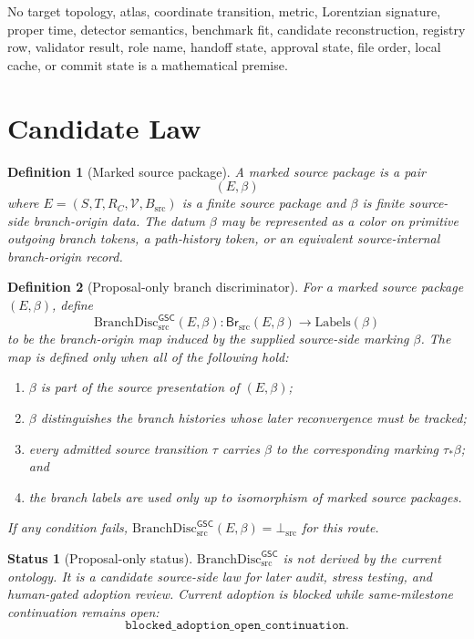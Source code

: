 \documentclass[11pt]{article}
\newcommand{\BottomSrc}{\bot_{\mathrm{src}}}
\newcommand{\BranchDisc}{\mathrm{BranchDisc}_{\mathrm{src}}^{\mathsf{GSC}}}
\newcommand{\BranchSet}{\mathsf{Br}_{\mathrm{src}}}
\newtheorem{definition}{Definition}
\newtheorem{status}{Status}
\begin{document}
No target topology, atlas, coordinate transition, metric, Lorentzian signature,
proper time, detector semantics, benchmark fit, candidate reconstruction,
registry row, validator result, role name, handoff state, approval state, file
order, local cache, or commit state is a mathematical premise.

\section{Candidate Law}

\begin{definition}[Marked source package]
A marked source package is a pair
\[
  (E,\beta)
\]
where \(E=(S,T,R_C,\mathcal V,B_{\mathrm{src}})\) is a finite source package
and \(\beta\) is finite source-side branch-origin data. The datum \(\beta\)
may be represented as a color on primitive outgoing branch tokens, a
path-history token, or an equivalent source-internal branch-origin record.
\end{definition}

\begin{definition}[Proposal-only branch discriminator]
For a marked source package \((E,\beta)\), define
\[
  \BranchDisc(E,\beta) : \BranchSet(E,\beta)\longrightarrow
  \mathrm{Labels}(\beta)
\]
to be the branch-origin map induced by the supplied source-side marking
\(\beta\). The map is defined only when all of the following hold:
\begin{enumerate}[leftmargin=*]
  \item \(\beta\) is part of the source presentation of \((E,\beta)\);
  \item \(\beta\) distinguishes the branch histories whose later
  reconvergence must be tracked;
  \item every admitted source transition \(\tau\) carries \(\beta\) to the
  corresponding marking \(\tau_\ast\beta\); and
  \item the branch labels are used only up to isomorphism of marked source
  packages.
\end{enumerate}
If any condition fails, \(\BranchDisc(E,\beta)=\BottomSrc\) for this route.
\end{definition}

\begin{status}[Proposal-only status]
\(\BranchDisc\) is not derived by the current ontology. It is a candidate
source-side law for later audit, stress testing, and human-gated adoption
review. Current adoption is blocked while same-milestone continuation remains
open:
\[
\texttt{blocked\_adoption\_open\_continuation}.
\]
\end{status}
\end{document}
